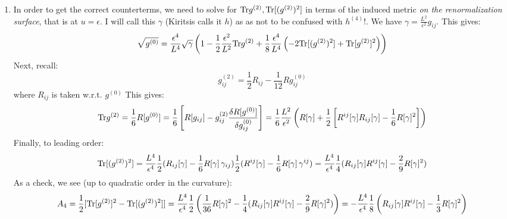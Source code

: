 \documentclass[11pt, class=article, crop=false]{standalone}
\begin{document}
\begin{enumerate}
	At zeroth order we get:
	\[
		\frac{L^3}{8 \pi G_5} \frac{1}{\epsilon^4} - \frac{L^3}{2 \pi G_5 \epsilon^4} = -6 \frac{L^3}{16 \pi G_5} \frac{1}{\epsilon^4} \Rightarrow A_0 = -6
	\]
	At second order we get:
	\[
		\frac{L^3}{4 \pi G_5} \frac12  \frac{1}{\epsilon^2} \Tr[ g^{(2)}] - \frac{L^3}{2 \pi G_5} (1 - \frac12 ) \frac{1}{2 \epsilon^2} \Tr[g^{(2)}] = 0 \Rightarrow A_2 = 0
	\]
	At fourth order only the first term of \eqref{eq:gravonshell} contributes and we get:
	\[
	\begin{aligned}
		-\frac{L^3}{4 \pi G_5} \log \epsilon^2 \Big( \frac12 \Tr[g^{(4)}] + & \frac18 \Tr[g^{2}]^2 - \frac14 \Tr[(g^{(2)})^2] \Big) = - \frac{L^3}{16 \pi G_5} \log \epsilon^2 \frac12 \left(\Tr[g^{2}]^2  - \Tr[(g^{2})^2]\right)\\
		 \Rightarrow A_4 &= \frac12 \left(\Tr[g^{2}]^2  - \Tr[(g^{2})^2]\right) = \mathcal A
	\end{aligned}
	\]
	\item 
	In order to get the correct counterterms, we need to solve for $\mathrm{Tr} g^{(2)}, \mathrm{Tr} [(g^{(2)})^2]$ in terms of the induced metric \emph{on the renormalization surface}, that is at $u = \epsilon$. I will call this $\gamma$  (Kiritsis calls it $h$) as as not to be confused with $h^{(4)}!$. We have $\gamma = \frac{L^2}{\epsilon^2} g_{ij}$. This gives:
	\[
		\sqrt{g^{(0)}} = \frac{\epsilon^4}{L^4} \sqrt{\gamma} \left(1 - \frac12 \frac{\epsilon^2}{L^2} \mathrm{Tr} g^{(2)} + \frac18 \frac{\epsilon^4}{L^4} \left(-2 \mathrm{Tr} [(g^{(2)})^2]  + \mathrm{Tr}[ g^{(2)}]^2 \right) \right)
	\]
	Next, recall:
	\[
		g^{(2)}_{ij} = \frac12 R_{ij} - \frac{1}{12} R g_{ij}^{(0)}
	\]
	where $R_{ij}$ is taken w.r.t. $g^{(0)}$
	This gives:
	\[
		\mathrm{Tr} g^{(2)} = \frac{1}{6} R[g^{(0)}] = \frac{1}{6} \left[R[g_{ij}] - g^{(2)}_{ij} \frac{\delta R[g^{(0)}]}{\delta g^{(0)}_{ij}}  \right] = \frac16 \frac{L^2}{\epsilon^2} \left(R[\gamma] + \frac{1}{2}\left[R^{ij}[\gamma] R_{ij}[\gamma] - \frac{1}{6} R[\gamma]^2 \right] \right)
	\]
	Finally, to leading order:
	\[
		\mathrm{Tr}[ (g^{(2)})^2] = \frac{L^4}{\epsilon^4} \frac12 (R_{ij}[\gamma] - \frac{1}{6} R[\gamma]\, \gamma_{ij}) \frac12 (R^{ij}[\gamma] - \frac{1}{6} R[\gamma]\, \gamma^{ij}) = \frac{L^4}{\epsilon^4} \frac14 ( R_{ij}[\gamma] R^{ij}[\gamma] - \frac{2}{9} R[\gamma]^2)
	\]
	As a check, we see (up to quadratic order in the curvature):
	\[
		A_4 = \frac12 [\mathrm{Tr}[g^{(2)}]^2 - \mathrm{Tr}[(g^{(2)})^2]] = \frac{L^4}{\epsilon^4} \frac12 \left( \frac{1}{36} R[\gamma]^2 - \frac14 ( R_{ij}[\gamma] R^{ij}[\gamma] - \frac{2}{9} R[\gamma]^2) \right) = -\frac{L^4}{\epsilon^4 }\frac{1}{8}\left(R_{ij}[\gamma] R^{ij}[\gamma] - \frac13 R[\gamma]^2 \right)
	\]
	

\end{enumerate}
\end{document}
